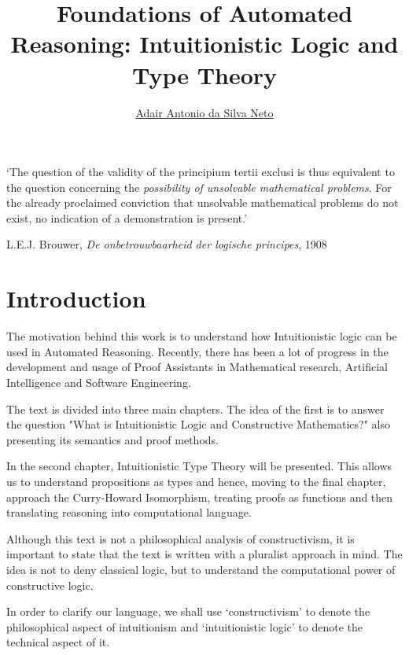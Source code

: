 \documentclass[12pt,a4paper]{article}
\author{\href{https://adairneto.github.io/}{Adair Antonio da Silva Neto}}
\title{Foundations of Automated Reasoning: Intuitionistic Logic and Type Theory}
\theoremstyle{definition}
\begin{document}
\clearpage\maketitle
\thispagestyle{empty}

\newpage

\tableofcontents

\newpage
\clearpage
\setcounter{page}{1}

\epigraph{`The question of the validity of the principium tertii exclusi is thus equivalent to the question concerning the \textit{possibility of unsolvable mathematical problems}. For the already proclaimed conviction that unsolvable mathematical problems do not exist, no indication of a demonstration is present.'}{L.E.J. Brouwer, \textit{De onbetrouwbaarheid der logische principes}, 1908}

\section*{Introduction}
\label{Introduction}

The motivation behind this work is to understand how Intuitionistic logic can be used in Automated Reasoning. Recently, there has been a lot of progress in the development and usage of Proof Assistants in Mathematical research, Artificial Intelligence and Software Engineering.

The text is divided into three main chapters. The idea of the first is to answer the question "What is Intuitionistic Logic and Constructive Mathematics?" also presenting its semantics and proof methods.

In the second chapter, Intuitionistic Type Theory will be presented. This allows us to understand propositions as types and hence, moving to the final chapter, approach the Curry-Howard Isomorphism, treating proofs as functions and then translating reasoning into computational language. 

Although this text is not a philosophical analysis of constructivism, it is important to state that the text is written with a pluralist approach in mind. The idea is not to deny classical logic, but to understand the computational power of constructive logic.

In order to clarify our language, we shall use `constructivism' to denote the philosophical aspect of intuitionism and `intuitionistic logic' to denote the technical aspect of it. 
\end{document}
